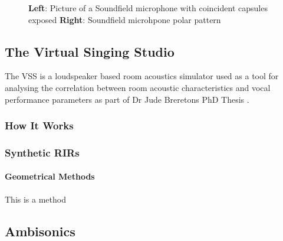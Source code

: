 \documentclass[../../main.tex]{subfiles}
\begin{document}
\begin{figure}[ht]
\begin{minipage}{0.5\textwidth}
				\end{minipage}
				\label{sfMic}
				\caption{\textbf{Left}: Picture of a Soundfield microphone with coincident capsules exposed \textbf{Right}: Soundfield microhpone polar pattern \cite{soundFieldMic}}
			\end{figure}

	\subsection{The Virtual Singing Studio}
		The \ac{VSS} is a loudspeaker based room acoustics simulator used as a tool for analysing the correlation between room acoustic characteristics and vocal performance parameters as part of Dr Jude Breretons PhD Thesis \cite{Brereton2014}.

		\subsubsection{How It Works}





\subsubsection{Synthetic RIRs}

\paragraph{Geometrical Methods}

This is a method

\subsection{Ambisonics}
\end{document}
